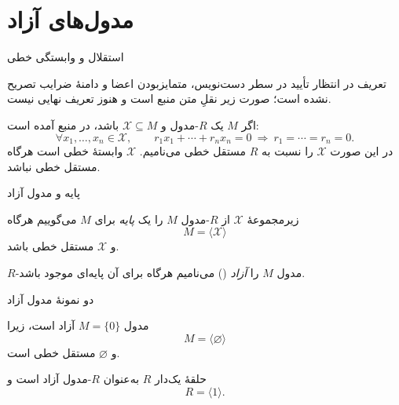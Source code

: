 \section{مدول‌های آزاد}

\begin{frame}[t]{استقلال و وابستگی خطی}
    \label{lec09:linear-independence}
    \begin{alertblock}{تعریف در انتظار تأیید }
        در سطر دست‌نویس، متمایزبودن اعضا و دامنهٔ ضرایب تصریح نشده است؛
        صورت زیر نقلِ متن منبع است و هنوز تعریف نهایی نیست.
    \end{alertblock}
    اگر $M$ یک $R$-مدول و $\mathcal X\subseteq M$ باشد، در منبع آمده است:
    \[
        \forall x_1,\ldots,x_n\in\mathcal X,\qquad
        r_1x_1+\cdots+r_nx_n=0
        \ \Longrightarrow\ r_1=\cdots=r_n=0.
    \]
    در این صورت $\mathcal X$ را نسبت به $R$ مستقل خطی می‌نامیم.
    $\mathcal X$ وابستهٔ خطی است هرگاه مستقل خطی نباشد.
\end{frame}

\begin{frame}[t]{پایه و مدول آزاد}
    \label{lec09:basis-and-free-module}
    \begin{definition}
        زیرمجموعهٔ $\mathcal X$ از $R$-مدول $M$ را یک \textit{پایه} برای $M$
        می‌گوییم هرگاه
        \[
            M=\langle\mathcal X\rangle
        \]
        و $\mathcal X$ مستقل خطی باشد.
    \end{definition}
    \begin{definition}
        $R$-مدول $M$ را \textit{آزاد} () می‌نامیم هرگاه برای آن
        پایه‌ای موجود باشد.
    \end{definition}
\end{frame}

\begin{frame}[t]{دو نمونهٔ مدول آزاد}
    \label{lec09:basic-free-examples}
    \begin{example}
        مدول $M=\{0\}$ آزاد است، زیرا
        \[
            M=\langle\varnothing\rangle
        \]
        و $\varnothing$ مستقل خطی است.
    \end{example}
    \begin{example}
        حلقهٔ یک‌دار $R$ به‌عنوان $R$-مدول آزاد است و
        \[
            R=\langle1\rangle.
        \]
    \end{example}
\end{frame}

